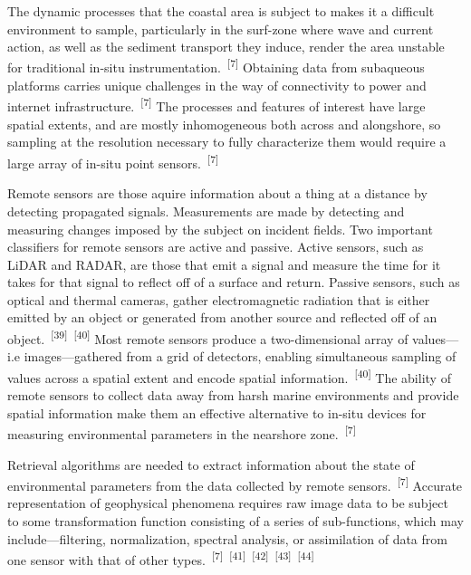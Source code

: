 \documentclass{article}
\begin{document}
\par{The dynamic processes that the coastal area is subject to makes it a difficult environment to sample, particularly in the surf-zone where wave and current action, as well as the sediment transport they induce, render the area unstable for traditional in-situ instrumentation.~\textsuperscript{[7]} Obtaining data from subaqueous platforms carries unique challenges in the way of connectivity to power and internet infrastructure.~\textsuperscript{[7]} The processes and features of interest have large spatial extents, and are mostly inhomogeneous both across and alongshore, so sampling at the resolution necessary to fully characterize them would require a large array of in-situ point sensors.~\textsuperscript{[7]}}


\par{Remote sensors are those aquire information about a thing at a distance by detecting propagated signals. Measurements are made by detecting and measuring changes imposed by the subject on incident fields. Two important classifiers for remote sensors are active and passive. Active sensors, such as LiDAR and RADAR, are those that emit a signal and measure the time for it takes for that signal to reflect off of a surface and return. Passive sensors, such as optical and thermal cameras, gather electromagnetic radiation that is either emitted by an object or generated from another source and reflected off of an object.~\textsuperscript{[39]}~\textsuperscript{[40]} Most remote sensors produce a two-dimensional array of values---i.e images---gathered from a grid of detectors, enabling simultaneous sampling of values across a spatial extent and encode spatial information.~\textsuperscript{[40]} The ability of remote sensors to collect data away from harsh marine environments and provide spatial information make them an effective alternative to in-situ devices for measuring environmental parameters in the nearshore zone.~\textsuperscript{[7]}}


\par{Retrieval algorithms are needed to extract information about the state of environmental parameters from the data collected by remote sensors.~\textsuperscript{[7]} Accurate representation of geophysical phenomena requires raw image data to be subject to some transformation function consisting of a series of sub-functions, which may include---filtering, normalization, spectral analysis, or assimilation of data from one sensor with that of other types.~\textsuperscript{[7]}~\textsuperscript{[41]}~\textsuperscript{[42]}~\textsuperscript{[43]}~\textsuperscript{[44]}}
\end{document}
